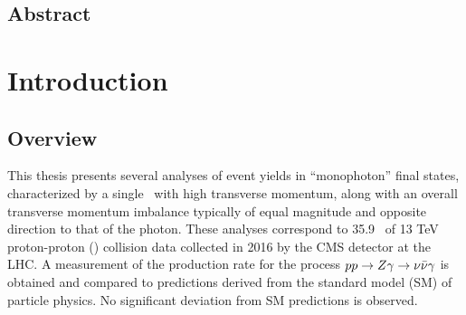 \documentclass[oneside, letterpaper, 12pt, oldfontcommands]{memoir}
\begin{document}
\frontmatter


\thetitlepage
\clearpage

\thecopyrightpage
\cleardoublepage

\setcounter{page}{1}

\section{Abstract}
\uwabstract
\cleardoublepage


\tableofcontents* %

\mainmatter

\chapter{Introduction} \label{chap:introduction}
\section{Overview} \label{sec:introduction_overview}
This thesis presents several analyses of event
yields in ``monophoton'' final states, characterized by a single \Pgamma\ with high transverse
momentum, along with an overall transverse momentum imbalance typically of equal magnitude and opposite direction to
that of the photon.
These analyses correspond to 35.9 \fbinv\ of 13 TeV proton-proton (\Pp\Pp) collision data collected in 2016 by the CMS
detector at the LHC. A measurement of the production rate for the process $pp \to Z\gamma \to \nu\bar{\nu}\gamma$ is obtained
and compared to predictions derived from the standard model (SM) of particle physics. No significant deviation from SM
predictions is observed.
\end{document}
